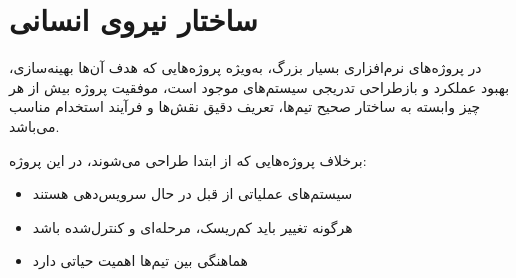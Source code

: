 \documentclass[12pt,a4paper]{report}
\begin{document}
\chapter{ساختار نیروی انسانی}

در پروژه‌های نرم‌افزاری بسیار بزرگ، به‌ویژه پروژه‌هایی که هدف آن‌ها بهینه‌سازی، بهبود عملکرد و بازطراحی تدریجی سیستم‌های موجود است، موفقیت پروژه بیش از هر چیز وابسته به ساختار صحیح تیم‌ها، تعریف دقیق نقش‌ها و فرآیند استخدام مناسب می‌باشد.

برخلاف پروژه‌هایی که از ابتدا طراحی می‌شوند، در این پروژه:
\begin{itemize}
	\item 
سیستم‌های عملیاتی از قبل در حال سرویس‌دهی هستند
	\item
هرگونه تغییر باید کم‌ریسک، مرحله‌ای و کنترل‌شده باشد
	\item
هماهنگی بین تیم‌ها اهمیت حیاتی دارد
\end{itemize}
\end{document}
